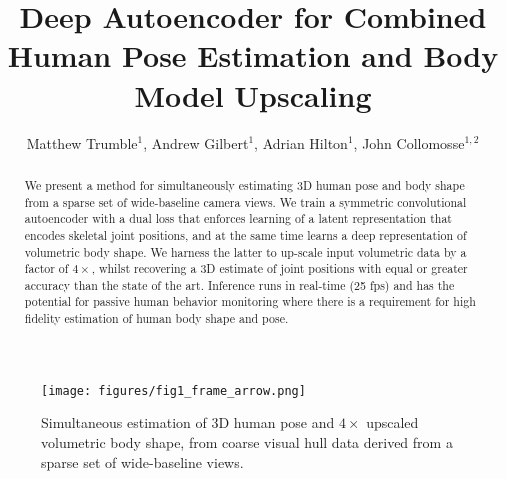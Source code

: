 \documentclass[runningheads]{llncs}
\begin{document}
\pagestyle{headings}
\mainmatter

\title{Deep Autoencoder for Combined Human Pose Estimation and Body Model Upscaling} 






\author{Matthew Trumble$^{1}$, Andrew Gilbert$^{1}$, Adrian Hilton$^{1}$, John Collomosse$^{1,2}$}





\newcommand{\etal}{{\em et~al.}\xspace}
\newcommand{\eg}{e.\,g.\xspace}
\newcommand{\ie}{i.\,e.\xspace}
\newcommand{\squeezeup}{\vspace{-4mm}}

\maketitle

\begin{abstract}
We present a method for simultaneously estimating 3D human pose and body shape from a sparse set of wide-baseline camera views.  We train a symmetric convolutional autoencoder with a dual loss that enforces learning of a latent representation that encodes skeletal joint positions, and at the same time learns a deep representation of volumetric body shape.  We harness the latter to up-scale input volumetric data by a factor of $4 \times$, whilst recovering a 3D estimate of joint positions with equal or greater accuracy than the state of the art.  Inference runs in real-time (25 fps) and has the potential for passive human behavior monitoring where there is a requirement for high fidelity estimation of human body shape and pose.

\end{abstract}
\squeezeup
\squeezeup
\squeezeup
\begin{figure}
\centering
\texttt{[image: figures/fig1\_frame\_arrow.png]}
\caption{Simultaneous estimation of 3D human pose and $4 \times$ upscaled volumetric body shape, from coarse visual hull data derived from a sparse set of wide-baseline views.}
\label{fig:teaser_totalcap}
\squeezeup
\squeezeup
\squeezeup
\end{figure}
\end{document}
